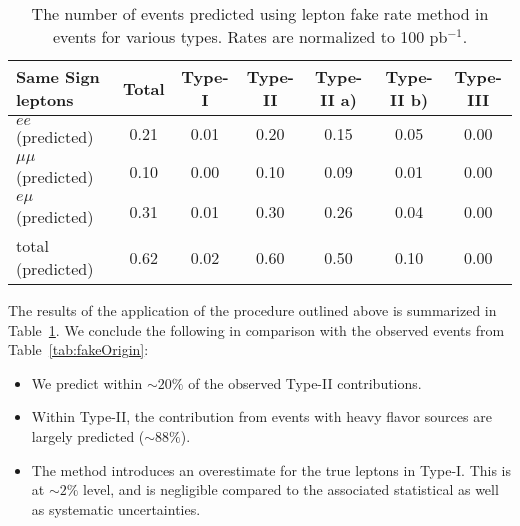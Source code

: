 \vspace{2mm}
\begin{table}[hbt]
\begin{center}
\begin{tabular}{|l|c|c|c|c|c|c|}\hline
Same Sign leptons & Total &      Type-I &  Type-II & Type-II a) & Type-II b) & Type-III \\ \hline
$ee$ (predicted) &	0.21 &	0.01 &	0.20 &	0.15 &	0.05 &	0.00 \\
$\mu\mu$ (predicted) &	0.10 &	0.00 &	0.10 &	0.09 &	0.01 &	0.00 \\
$e\mu$ (predicted) &	0.31 &	0.01 &	0.30 &	0.26 &	0.04 &	0.00 \\
total (predicted) &	0.62 &	0.02 &	0.60 &	0.50 &	0.10 &	0.00 \\
\hline
\end{tabular}
\caption{ The number of events predicted using lepton fake rate method in \ttbar events for various types. 
Rates are normalized to 100 pb$^{-1}$.\label{tab:LeptonFakePredict}}
\end{center}
\end{table}
 The results of the application of the procedure outlined above is summarized in Table~\ref{tab:LeptonFakePredict}. 
We conclude the following in comparison with the observed events from Table~\ref{tab:fakeOrigin}:


\begin{itemize}
\item We predict within $\sim 20 \%$ of the observed Type-II contributions.
\item Within Type-II, the contribution from events with heavy flavor sources are largely predicted ($\sim 88 \%$).
\item The method introduces an overestimate for the true leptons in Type-I. This is at $\sim 2 \%$ level, 
and is negligible compared to the associated statistical as well as systematic uncertainties.
\end{itemize}
